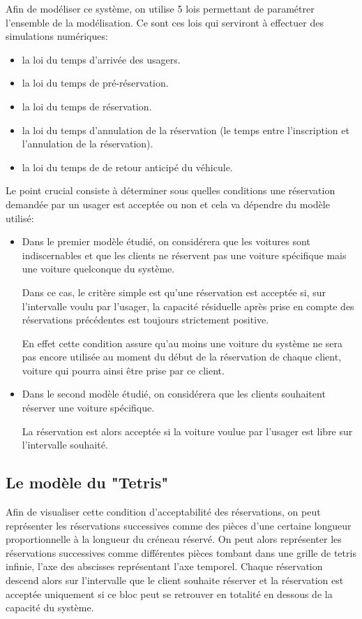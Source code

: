 \documentclass[12pt,a4paper]{article}
\newcommand{\1}[1]{\mathbbm{1}_{\{#1\}} }
\theoremstyle{definition}
\begin{document}
{Afin de modéliser ce système, on utilise 5 lois permettant de paramétrer l'ensemble de la modélisation. Ce sont ces lois qui serviront à effectuer des simulations numériques:
\begin{itemize}
\item la loi du temps d'arrivée des usagers.
\item la loi du temps de pré-réservation.
\item la loi du temps de réservation.
\item la loi du temps d'annulation de la réservation (le temps entre l'inscription et l'annulation de la réservation).
\item la loi du temps de de retour anticipé du véhicule.
\end{itemize}
\medskip
Le point crucial consiste à déterminer sous quelles conditions une réservation demandée par un usager est acceptée ou non et cela va dépendre du modèle utilisé:
\begin{itemize}
\item Dans le premier modèle étudié, on considérera que les voitures sont indiscernables et que les clients ne réservent pas une voiture spécifique mais une voiture quelconque du système.

Dans ce cas, le critère simple est qu'une réservation est acceptée si, sur l'intervalle voulu par l'usager, la capacité résiduelle après prise en compte des réservations précédentes est toujours strictement positive.

En effet cette condition assure qu'au moins une voiture du système ne sera pas encore utilisée au moment du début de la réservation de chaque client, voiture qui pourra ainsi être prise par ce client.

\item Dans le second modèle étudié, on considérera que les clients souhaitent réserver une voiture spécifique.

La réservation est alors acceptée si la voiture voulue par l'usager est libre sur l'intervalle souhaité.
\end{itemize}




\subsection{Le modèle du "Tetris"}

Afin de visualiser cette condition d'acceptabilité des réservations, on peut représenter les réservations successives comme des pièces d'une certaine longueur proportionnelle à la longueur du créneau réservé. On peut alors représenter les réservations successives comme différentes pièces tombant dans une grille de tetris infinie, l'axe des abscisses représentant l'axe temporel.
Chaque réservation descend alors sur l'intervalle que  le client souhaite réserver et la réservation est acceptée uniquement si ce bloc peut se retrouver en totalité en dessous de la capacité du système.

}
\end{document}
